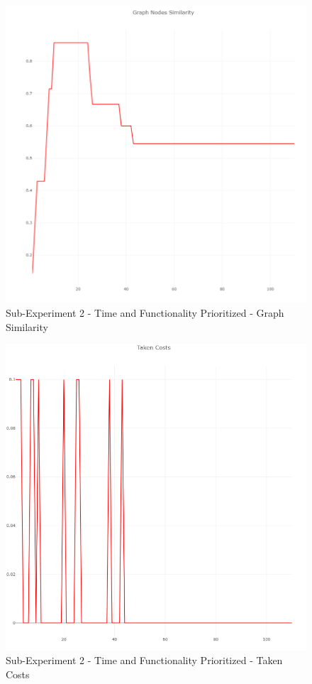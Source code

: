 \begin{figure}[h]
	\centering
	\includegraphics[scale=0.7]{./pictures/time_functionality_experiment/similarity.png}
	\caption{Sub-Experiment 2 - Time and Functionality Prioritized - Graph Similarity}
	\label{time_func_experiment_sim}
\end{figure}
%
\newpage
%
\begin{figure}[h]
	\centering
	\includegraphics[scale=0.5]{./pictures/time_functionality_experiment/costs.png}
	\caption{Sub-Experiment 2 - Time and Functionality Prioritized - Taken Costs}
	\label{time_func_experiment_costs}
\end{figure}
